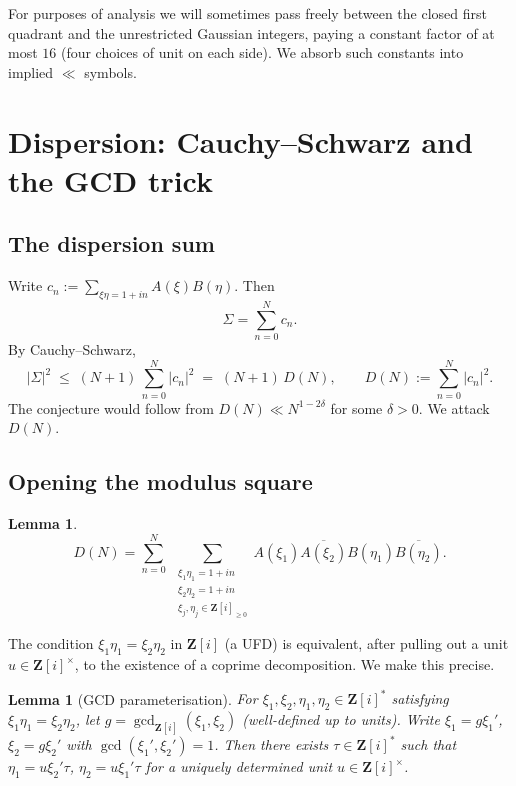 \documentclass[11pt]{article}
\newtheorem{lemma}[theorem]{Lemma}
\theoremstyle{definition}
\newcommand{\Z}{\mathbf{Z}}
\newcommand{\Zi}{\Z[i]}
\begin{document}
For purposes of analysis we will sometimes pass freely between the closed first quadrant and the unrestricted Gaussian integers, paying a constant factor of at most $16$ (four choices of unit on each side). We absorb such constants into implied $\ll$ symbols.

\section{Dispersion: Cauchy--Schwarz and the GCD trick}\label{sec:dispersion}

\subsection{The dispersion sum}

Write $c_n:=\sum_{\xi\eta=1+in}A(\xi)B(\eta)$. Then
\[
\Sigma=\sum_{n=0}^N c_n.
\]
By Cauchy--Schwarz,
\begin{equation}\label{eq:CS-disp}
|\Sigma|^2\;\le\;(N+1)\,\sum_{n=0}^N|c_n|^2\;=\;(N+1)\,D(N),\qquad D(N):=\sum_{n=0}^N|c_n|^2.
\end{equation}
The conjecture would follow from $D(N)\ll N^{1-2\delta}$ for some $\delta>0$. We attack $D(N)$.

\subsection{Opening the modulus square}

\begin{lemma}\label{lem:open-square}
\[
D(N)=\sum_{n=0}^N\;\sum_{\substack{\xi_1\eta_1=1+in\\\xi_2\eta_2=1+in\\\xi_j,\eta_j\in\Zi_{\ge 0}}}A(\xi_1)\overline{A(\xi_2)}B(\eta_1)\overline{B(\eta_2)}.
\]
\end{lemma}

The condition $\xi_1\eta_1=\xi_2\eta_2$ in $\Zi$ (a UFD) is equivalent, after pulling out a unit $u\in\Zi^\times$, to the existence of a coprime decomposition. We make this precise.

\begin{lemma}[GCD parameterisation]\label{lem:gcd-param}
For $\xi_1,\xi_2,\eta_1,\eta_2\in\Zi^*$ satisfying $\xi_1\eta_1=\xi_2\eta_2$, let $g=\gcd_{\Zi}(\xi_1,\xi_2)$ (well-defined up to units). Write $\xi_1=g\xi_1'$, $\xi_2=g\xi_2'$ with $\gcd(\xi_1',\xi_2')=1$. Then there exists $\tau\in\Zi^*$ such that $\eta_1=u\xi_2'\tau$, $\eta_2=u\xi_1'\tau$ for a uniquely determined unit $u\in\Zi^\times$.
\end{lemma}
\end{document}
